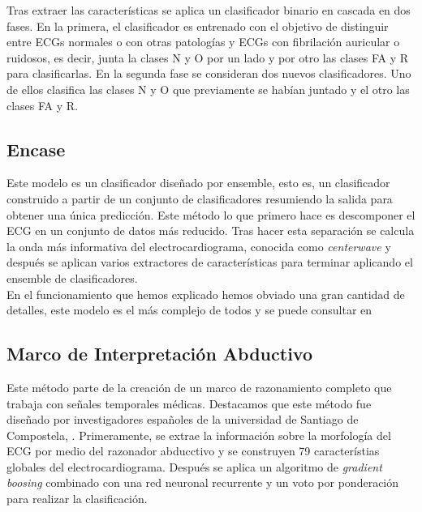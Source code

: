              Tras extraer las características se aplica un clasificador binario en cascada en dos fases. En la primera, el clasificador es entrenado con el objetivo de distinguir entre ECGs normales o con otras patologías y ECGs con fibrilación auricular o ruidosos, es decir, junta la clases N y O por un lado y por otro las clases FA y R para clasificarlas. En la segunda fase se consideran dos nuevos clasificadores. Uno de ellos clasifica las clases N y O que previamente se habían juntado y el otro las clases FA y R. \\ 
             
    \subsection{Encase}
        
            Este modelo es un clasificador diseñado por ensemble, esto es, un clasificador construido a partir de un conjunto de clasificadores resumiendo la salida para obtener una única predicción. Este método lo que primero hace es descomponer el ECG en un conjunto de datos más reducido. Tras hacer esta separación se calcula la onda más informativa del electrocardiograma, conocida como \textit{centerwave} y después se aplican varios extractores de características para terminar aplicando el ensemble de clasificadores. \\
            
            En el funcionamiento que hemos explicado hemos obviado una gran cantidad de detalles, este modelo es el más complejo de todos y se puede consultar en \cite{hong2017encase}
            
          
        
    \subsection{Marco de Interpretación Abductivo}
        
            Este método parte de la creación de un marco de razonamiento completo que trabaja con señales temporales médicas. Destacamos que este método fue diseñado por investigadores españoles de la universidad de Santiago de Compostela, \cite{teijeiro2017arrhythmia}. Primeramente, se extrae la información sobre la morfología del ECG por medio del razonador abducctivo y se construyen 79 característias globales del electrocardiograma. Después se aplica un algoritmo de \textit{gradient boosing} combinado con una red neuronal recurrente y un voto por ponderación para realizar la clasificación. \\
        
